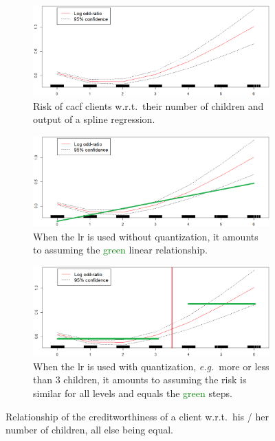 \begin{figure}[!ht]
\begin{subfigure}[t]{.9\textwidth}
\centering \includegraphics[width = .8\textwidth]{figures/chapitre4/nbenf_spline.png}
\caption{\label{fig:nbenf_spline} Risk of \gls{cacf} clients w.r.t.\ their number of children and output of a spline regression.}
\end{subfigure}
\begin{subfigure}[t]{.9\textwidth}
\centering \includegraphics[width = .8\textwidth]{figures/chapitre4/nbenf_spline_cont.png}
\caption{\label{fig:nbenf_cont} When the \gls{lr} is used without quantization, it amounts to assuming the \textcolor{green}{green} linear relationship.}
\end{subfigure}
\begin{subfigure}[t]{.9\textwidth}
\centering \includegraphics[width = .8\textwidth]{figures/chapitre4/nbenf_spline_disc.png}
\caption{\label{fig:nbenf_disc} When the \gls{lr} is used with quantization, \textit{e.g.}\ more or less than 3 children, it amounts to assuming the risk is similar for all levels and equals the \textcolor{green}{green} steps.}
\end{subfigure}
\caption{Relationship of the creditworthiness of a client w.r.t.\ his / her number of children, all else being equal.}
\label{fig:splines}
\end{figure}


